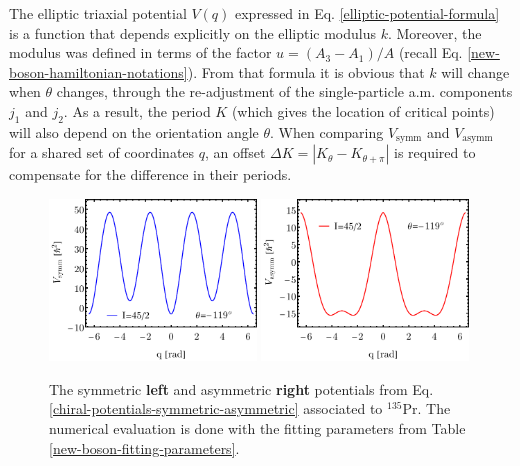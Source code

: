 The elliptic triaxial potential $V(q)$ expressed in Eq. \ref{elliptic-potential-formula} is a function that depends explicitly on the elliptic modulus $k$. Moreover, the modulus was defined in terms of the factor $u=(A_3-A_1)/A$ (recall Eq. \ref{new-boson-hamiltonian-notations}). From that formula it is obvious that $k$ will change when $\theta$ changes, through the re-adjustment of the single-particle a.m. components $j_1$ and $j_2$. As a result, the period $K$ (which gives the location of critical points) will also depend on the orientation angle $\theta$. When comparing $V_\text{symm}$ and $V_\text{asymm}$ for a shared set of coordinates $q$, an offset $\Delta K=\left|K_\theta-K_{\theta+\pi}\right|$ is required to compensate for the difference in their periods.
\begin{figure}
    \centering
    \includegraphics[width=0.49\textwidth]{Chapters/Figures/symmetric-potential-135Pr.pdf}
    \includegraphics[width=0.49\textwidth]{Chapters/Figures/asymmetric-potential-135Pr.pdf}
    \caption{The symmetric \textbf{left} and asymmetric \textbf{right} potentials from Eq. \ref{chiral-potentials-symmetric-asymmetric} associated to $^{135}$Pr. The numerical evaluation is done with the fitting parameters from Table \ref{new-boson-fitting-parameters}.}
    \label{chiral-potentials-plot}
\end{figure}

